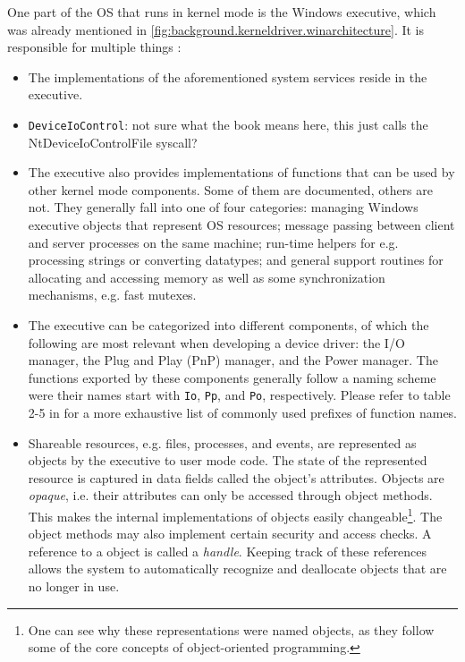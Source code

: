 One part of the OS that runs in kernel mode is the Windows executive, which was already mentioned in \autoref{fig:background.kerneldriver.winarchitecture}. It is responsible for multiple things \cite{Yosifovich2017}:
\begin{itemize}
	\item The implementations of the aforementioned system services reside in the executive.
	\item \texttt{DeviceIoControl}: not sure what the book means here, this just calls the NtDeviceIoControlFile syscall? \\
	\item The executive also provides implementations of functions that can be used by other kernel mode components. Some of them are documented, others are not. They generally fall into one of four categories: managing Windows executive objects that represent OS resources; message passing between client and server processes on the same machine; run-time helpers for e.g. processing strings or converting datatypes; and general support routines for allocating and accessing memory as well as some synchronization mechanisms, e.g. fast mutexes.
	\item The executive can be categorized into different components, of which the following are most relevant when developing a device driver: the I/O manager, the Plug and Play (PnP) manager, and the Power manager. The functions exported by these components generally follow a naming scheme were their names start with \texttt{Io}, \texttt{Pp}, and \texttt{Po}, respectively. Please refer to table 2-5 in \cite{Yosifovich2017} for a more exhaustive list of commonly used prefixes of function names.
	\item Shareable resources, e.g. files, processes, and events, are represented as objects by the executive to user mode code. The state of the represented resource is captured in data fields called the object's attributes. Objects are \emph{opaque}, i.e. their attributes can only be accessed through object methods. This makes the internal implementations of objects easily changeable\footnote{\label{fn:background.kerneldriver.oop} One can see why these representations were named objects, as they follow some of the core concepts of object-oriented programming.}. The object methods may also implement certain security and access checks. A reference to a object is called a \emph{handle}. Keeping track of these references allows the system to automatically recognize and deallocate objects that are no longer in use.
\end{itemize}

